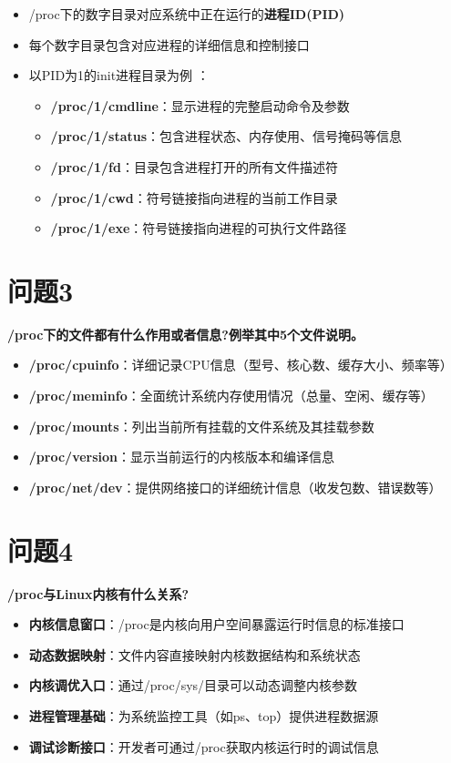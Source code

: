 \documentclass[12pt,hyperref,a4paper,UTF8]{ctexart}
\begin{document}
\begin{itemize}
\item /proc下的数字目录对应系统中正在运行的\textbf{进程ID(PID)} \cite{tldp}  
\item 每个数字目录包含对应进程的详细信息和控制接口
\item 以PID为1的init进程目录为例 \cite{man7}  ：
\begin{itemize}
\item \textbf{/proc/1/cmdline}：显示进程的完整启动命令及参数
\item \textbf{/proc/1/status}：包含进程状态、内存使用、信号掩码等信息
\item \textbf{/proc/1/fd}：目录包含进程打开的所有文件描述符
\item \textbf{/proc/1/cwd}：符号链接指向进程的当前工作目录
\item \textbf{/proc/1/exe}：符号链接指向进程的可执行文件路径
\end{itemize}
\end{itemize}

\section{问题3}

\textbf{/proc下的文件都有什么作用或者信息?例举其中5个文件说明。}

\begin{itemize}
\item \textbf{/proc/cpuinfo}：详细记录CPU信息（型号、核心数、缓存大小、频率等）\cite{kernel-doc}  
\item \textbf{/proc/meminfo}：全面统计系统内存使用情况（总量、空闲、缓存等）\cite{ibm}  
\item \textbf{/proc/mounts}：列出当前所有挂载的文件系统及其挂载参数 \cite{ubuntu}  
\item \textbf{/proc/version}：显示当前运行的内核版本和编译信息 \cite{man7}  
\item \textbf{/proc/net/dev}：提供网络接口的详细统计信息（收发包数、错误数等）\cite{tldp}
\end{itemize}

\section{问题4}

\textbf{/proc与Linux内核有什么关系?}

\begin{itemize}
\item \textbf{内核信息窗口}：/proc是内核向用户空间暴露运行时信息的标准接口 \cite{kernel-doc}  
\item \textbf{动态数据映射}：文件内容直接映射内核数据结构和系统状态 \cite{ibm}  
\item \textbf{内核调优入口}：通过/proc/sys/目录可以动态调整内核参数 \cite{man7}  
\item \textbf{进程管理基础}：为系统监控工具（如ps、top）提供进程数据源 \cite{tldp}  
\item \textbf{调试诊断接口}：开发者可通过/proc获取内核运行时的调试信息 \cite{ubuntu}  
\end{itemize}

\end{document}
